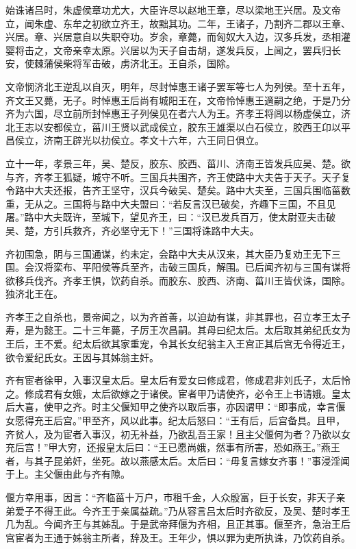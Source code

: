 \documentclass[]{article}
\begin{document}
始诛诸吕时，朱虚侯章功尤大，大臣许尽以赵地王章，尽以梁地王兴居。及文帝立，闻朱虚、东牟之初欲立齐王，故黜其功。二年，王诸子，乃割齐二郡以王章、兴居。章、兴居意自以失职夺功。岁余，章薨，而匈奴大入边，汉多兵发，丞相灌婴将击之，文帝亲幸太原。兴居以为天子自击胡，遂发兵反，上闻之，罢兵归长安，使棘蒲侯柴将军击破，虏济北王。王自杀，国除。

文帝悯济北王逆乱以自灭，明年，尽封悼惠王诸子罢军等七人为列侯。至十五年，齐文王又薨，无子。时悼惠王后尚有城阳王在，文帝怜悼惠王適嗣之绝，于是乃分齐为六国，尽立前所封悼惠王子列侯见在者六人为王。齐孝王将闾以杨虚侯立，济北王志以安都侯立，菑川王贤以武成侯立，胶东王雄渠以白石侯立，胶西王卬以平昌侯立，济南王辟光以扐侯立。孝文十六年，六王同日俱立。

立十一年，孝景三年，吴、楚反，胶东、胶西、菑川、济南王皆发兵应吴、楚。欲与齐，齐孝王狐疑，城守不听。三国兵共围齐，齐王使路中大夫告于天子。天子复令路中大夫还报，告齐王坚守，汉兵今破吴、楚矣。路中大夫至，三国兵围临菑数重，无从之。三国将与路中大夫盟曰：``若反言汉已破矣，齐趣下三国，不且见屠。''路中大夫既许，至城下，望见齐王，曰：``汉已发兵百万，使太尉亚夫击破吴、楚，方引兵救齐，齐必坚守无下！''三国将诛路中大夫。

齐初围急，阴与三国通谋，约未定，会路中大夫从汉来，其大臣乃复劝王无下三国。会汉将栾布、平阳侯等兵至齐，击破三国兵，解围。已后闻齐初与三国有谋将欲移兵伐齐。齐孝王惧，饮药自杀。而胶东、胶西、济南、菑川王皆伏诛，国除。独济北王在。

齐孝王之自杀也，景帝闻之，以为齐首善，以迫劫有谋，非其罪也，召立孝王太子寿，是为懿王。二十三年薨，子厉王次昌嗣。其母曰纪太后。太后取其弟纪氏女为王后，王不爱。纪太后欲其家重宠，令其长女纪翁主入王宫正其后宫无令得近王，欲令爱纪氏女。王因与其姊翁主奸。

齐有宦者徐甲，入事汉皇太后。皇太后有爱女曰修成君，修成君非刘氏子，太后怜之。修成君有女娥，太后欲嫁之于诸侯。宦者甲乃请使齐，必令王上书请娥。皇太后大喜，使甲之齐。时主父偃知甲之使齐以取后事，亦因谓甲：``即事成，幸言偃女愿得充王后宫。''甲至齐，风以此事。纪太后怒曰：``王有后，后宫备具。且甲，齐贫人，及为宦者入事汉，初无补益，乃欲乱吾王家！且主父偃何为者？乃欲以女充后宫！''甲大穷，还报皇太后曰：``王已愿尚娥，然事有所害，恐如燕王。''燕王者，与其子昆弟奸，坐死。故以燕感太后。太后曰：``毋复言嫁女齐事！''事浸淫闻于上。主父偃由此与齐有隙。

偃方幸用事，因言：``齐临菑十万户，市租千金，人众殷富，巨于长安，非天子亲弟爱子不得王此。今齐王于亲属益疏。''乃从容言吕太后时齐欲反，及吴、楚时孝王几为乱。今闻齐王与其姊乱。于是武帝拜偃为齐相，且正其事。偃至齐，急治王后宫宦者为王通于姊翁主所者，辞及王。王年少，惧以罪为吏所执诛，乃饮药自杀。
\end{document}

